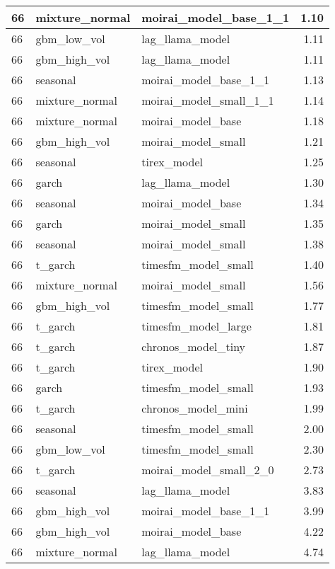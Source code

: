 {\begin{tabular}{lllr}
\midrule
66 & mixture\_normal & moirai\_model\_base\_1\_1 & 1.10 \\
\midrule
66 & gbm\_low\_vol & lag\_llama\_model & 1.11 \\
\midrule
66 & gbm\_high\_vol & lag\_llama\_model & 1.11 \\
\midrule
66 & seasonal & moirai\_model\_base\_1\_1 & 1.13 \\
\midrule
66 & mixture\_normal & moirai\_model\_small\_1\_1 & 1.14 \\
\midrule
66 & mixture\_normal & moirai\_model\_base & 1.18 \\
\midrule
66 & gbm\_high\_vol & moirai\_model\_small & 1.21 \\
\midrule
66 & seasonal & tirex\_model & 1.25 \\
\midrule
66 & garch & lag\_llama\_model & 1.30 \\
\midrule
66 & seasonal & moirai\_model\_base & 1.34 \\
\midrule
66 & garch & moirai\_model\_small & 1.35 \\
\midrule
66 & seasonal & moirai\_model\_small & 1.38 \\
\midrule
66 & t\_garch & timesfm\_model\_small & 1.40 \\
\midrule
66 & mixture\_normal & moirai\_model\_small & 1.56 \\
\midrule
66 & gbm\_high\_vol & timesfm\_model\_small & 1.77 \\
\midrule
66 & t\_garch & timesfm\_model\_large & 1.81 \\
\midrule
66 & t\_garch & chronos\_model\_tiny & 1.87 \\
\midrule
66 & t\_garch & tirex\_model & 1.90 \\
\midrule
66 & garch & timesfm\_model\_small & 1.93 \\
\midrule
66 & t\_garch & chronos\_model\_mini & 1.99 \\
\midrule
66 & seasonal & timesfm\_model\_small & 2.00 \\
\midrule
66 & gbm\_low\_vol & timesfm\_model\_small & 2.30 \\
\midrule
66 & t\_garch & moirai\_model\_small\_2\_0 & 2.73 \\
\midrule
66 & seasonal & lag\_llama\_model & 3.83 \\
\midrule
66 & gbm\_high\_vol & moirai\_model\_base\_1\_1 & 3.99 \\
\midrule
66 & gbm\_high\_vol & moirai\_model\_base & 4.22 \\
\midrule
66 & mixture\_normal & lag\_llama\_model & 4.74 \\
\bottomrule
\end{tabular}
}